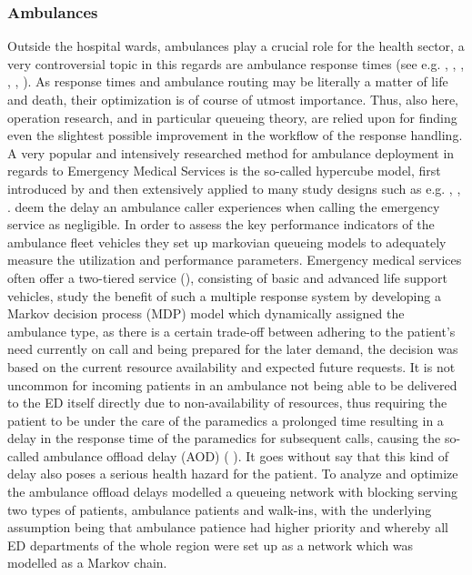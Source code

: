 \documentclass[11pt,a4paper]{article}
\begin{document}
\begin{spacing}{1.8}
\subsubsection{Ambulances}
Outside the hospital wards, ambulances play a crucial role for the health sector, a very controversial topic in this regards are ambulance response times (see e.g. \citep{Mell2017}, \citep{Lam2015}, \citep{Brown1999}, \citep{Pons2002}, \citep{Lee2019}, \citep{Carvalho2020}). As  response times and ambulance routing may be literally a matter of life and death, their optimization is of course of utmost importance.
Thus, also here, operation research, and in particular queueing theory, are relied upon for finding even the slightest possible improvement in the workflow of the response handling.
A very popular  and intensively researched method for ambulance deployment in regards to Emergency Medical Services is the so-called hypercube model, first introduced by \citep{Larson1974} and then extensively applied to many study designs such as e.g.  \citep{Morabito2008}, \citep{Atkinson2008} \citep{Iannoni2011} \citep{Souza2015}, \citep{Rodrigues2017}.
\citep{Singer2008} deem the delay an ambulance caller experiences when calling the emergency service as negligible.  In order to assess the  key performance indicators of the ambulance fleet  vehicles they set up markovian queueing models to adequately measure the utilization and performance parameters.
Emergency medical services often offer a two-tiered service  (\citep{Mandell1998}), consisting of basic and advanced life support vehicles,   \citet{Yoon2020} study the benefit of such a multiple response system by developing a Markov decision process (MDP) model which dynamically assigned the ambulance type, as there is a certain trade-off between adhering to the patient's need currently on call and being prepared for the later demand, the decision was based on the current resource availability and expected future requests. \medskip It is not uncommon for incoming patients in an ambulance not being able to be delivered to the  ED itself directly due to non-availability of resources, thus requiring the patient to be under the care of the paramedics a prolonged time resulting in a delay in the response time of the paramedics for subsequent calls, causing the so-called ambulance offload delay (AOD) (\citep{Li2018} \citep{Li2021}).  It goes without say that this kind of delay also poses a serious health hazard for the patient. To analyze and optimize the ambulance offload delays \citet{Almehdawe2016} modelled a queueing network with blocking serving two types of patients, ambulance patients and walk-ins, with the underlying assumption being that ambulance patience had higher priority and whereby all ED departments of the whole region were set up as a network which was modelled as a Markov chain.

\end{spacing}
\end{document}
